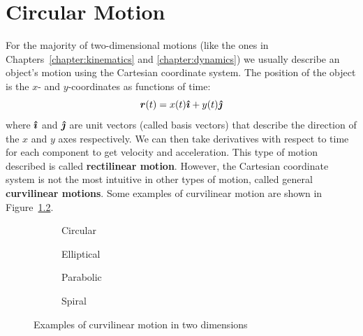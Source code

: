 \chapter{Circular Motion}
\label{chapter:circ-motion}

For the majority of two-dimensional motions (like the ones in
Chapters~\ref{chapter:kinematics} and \ref{chapter:dynamics}) we usually
describe an object's motion using the Cartesian coordinate system. The
position of the object is the $x$- and $y$-coordinates as functions of time:
\begin{equation}
  \bm r(t)=x(t)\bm{\hat\imath} + y(t)\bm{\hat\jmath}
\end{equation}
where $\bm{\hat\imath}$ and $\bm{\hat\jmath}$ are unit vectors (called basis vectors) that describe
the direction of the $x$ and $y$ axes respectively. We can then take derivatives
with respect to time for each component to get velocity and acceleration.
This type of motion described is called \textbf{rectilinear motion}. However,
the Cartesian coordinate system is not the most intuitive in other types of
motion, called general \textbf{curvilinear motions}. Some examples of
curvilinear motion are shown in Figure~\ref{fig:curvilinear-motions}.
\begin{figure}[ht]
  \centering
  \begin{subfigure}{.23\linewidth}
    \centering
    \caption{Circular}
    \label{fig:circ-motion1}
  \end{subfigure}
  \begin{subfigure}{.23\linewidth}
    \centering
    \caption{Elliptical}
  \end{subfigure}  
  \begin{subfigure}{.23\linewidth}
    \centering
    \caption{Parabolic}
  \end{subfigure}
  \begin{subfigure}{.23\linewidth}
    \centering
    \caption{Spiral}
  \end{subfigure}
  \caption{Examples of curvilinear motion in two dimensions}
  \label{fig:curvilinear-motions}
\end{figure}

